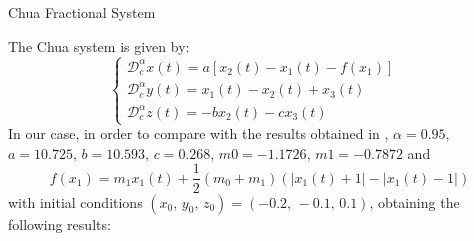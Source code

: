 \begin{exmp}
Chua Fractional System
\end{exmp}

The Chua system is given by:
\begin{equation}
    \begin{cases}
        \mathcal{D}_c^\alpha x(t) = a\left[x_2(t)-x_1(t)-f(x_1)\right]&\\
        \mathcal{D}_c^\alpha y(t) = x_1(t)-x_2(t)+x_3(t)&\\
        \mathcal{D}_c^\alpha z(t) = -bx_2(t)-cx_3(t)
    \end{cases}
\end{equation}
In our case, in order to compare with the results obtained in \cite{yang2018generation}, $\alpha=0.95$, $a=10.725$, $b=10.593$, $c = 0.268$, $m0 = -1.1726$, $m1 = -0.7872$ and
\begin{equation*}
    f(x_1)=m_1x_1(t)+\dfrac{1}{2}(m_0+m_1)\left(|x_1(t)+1|-|x_1(t)-1|\right)
\end{equation*}
with initial conditions $(x_0,\,y_0,\,z_0)=(-0.2,\, -0.1,\, 0.1)$, obtaining the following results:

